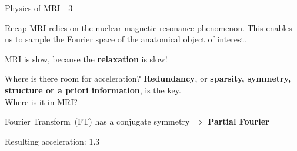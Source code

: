 \begin{frame}{Physics of MRI - 3}
    \begin{block}{Recap}
        MRI relies on the nuclear magnetic resonance phenomenon. This enables us to sample the Fourier space of the anatomical object of interest.
    \end{block}
    \pause
    MRI is slow, because the \textbf{relaxation} is slow!
\end{frame}

\begin{frame}{Where is there room for acceleration?}
    \textbf{Redundancy}, or \textbf{sparsity, symmetry, structure or a priori information}, is the key.\\
    
    
    
    \pause
        \hfill \break
        Where is it in MRI?

        Fourier Transform~(FT) has a conjugate symmetry $\Rightarrow$ \textbf{Partial Fourier}
        
        Resulting acceleration: 1.3
    
    
\end{frame}

